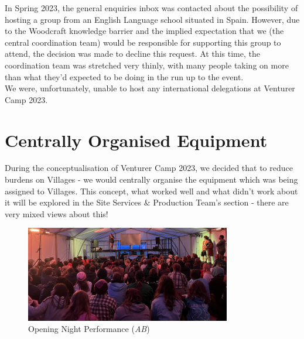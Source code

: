 In Spring 2023, the general enquiries inbox was contacted about the possibility of hosting a group from an English Language school situated in Spain. However, due to the Woodcraft knowledge barrier and the implied expectation that we (the central coordination team) would be responsible for supporting this group to attend, the decision was made to decline this request. At this time, the coordination team was stretched very thinly, with many people taking on more than what they'd expected to be doing in the run up to the event.\\

We were, unfortunately, unable to host any international delegations at Venturer Camp 2023. 

\section{Centrally Organised Equipment}
During the conceptualisation of Venturer Camp 2023, we decided that to reduce burdens on Villages - we would centrally organise the equipment which was being assigned to Villages. This concept, what worked well and what didn't work about it will be explored in the Site Services \& Production Team's section - there are very mixed views about this!


\begin{figure}[ht]
    \centering
    \includegraphics[width=0.8\textwidth]{assets/opening-night-ab.jpeg}
    \caption{Opening Night Performance (\textit{AB})}
\end{figure}
